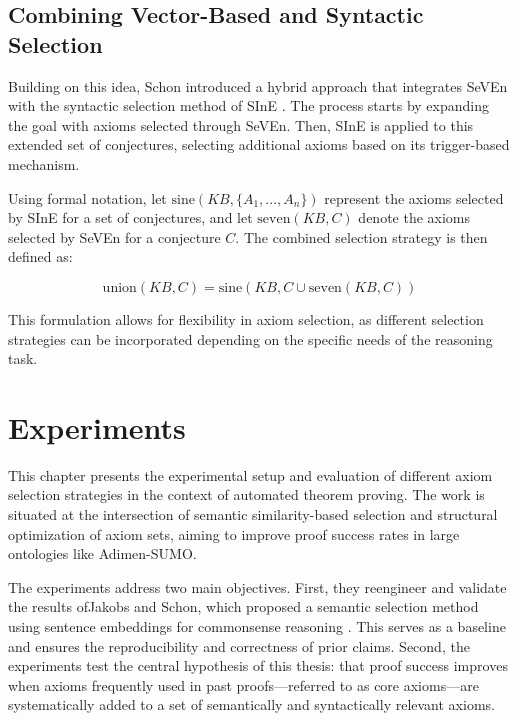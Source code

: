 \documentclass[english,version-2020-11]{uzl-thesis}
\begin{document}
\section{Combining Vector-Based and Syntactic Selection}

Building on this idea, Schon introduced a hybrid approach that integrates SeVEn with the syntactic selection method of SInE \cite{Schon2023}. The process starts by expanding the goal with axioms selected through SeVEn. Then, SInE is applied to this extended set of conjectures, selecting additional axioms based on its trigger-based mechanism. 

Using formal notation, let \( \text{sine}(KB, \{A_1, ..., A_n\}) \) represent the axioms selected by SInE for a set of conjectures, and let \( \text{seven}(KB, C) \) denote the axioms selected by SeVEn for a conjecture \( C \). The combined selection strategy is then defined as:

\begin{definition}
    \begin{equation}
        \text{union}(KB, C) = \text{sine}(KB, C \cup \text{seven}(KB, C))
    \end{equation}
\end{definition}

This formulation allows for flexibility in axiom selection, as different selection strategies can be incorporated depending on the specific needs of the reasoning task.


\chapter{Experiments}
\label{chapter-experiments}

This chapter presents the experimental setup and evaluation of different axiom selection strategies in the context of automated theorem proving. The work is situated at the intersection of semantic similarity-based selection and structural optimization of axiom sets, aiming to improve proof success rates in large ontologies like Adimen-SUMO.

The experiments address two main objectives. First, they reengineer and validate the results ofJakobs and Schon, which proposed a semantic selection method using sentence embeddings for commonsense reasoning \cite{Schon2024}. This serves as a baseline and ensures the reproducibility and correctness of prior claims. Second, the experiments test the central hypothesis of this thesis: that proof success improves when axioms frequently used in past proofs—referred to as core axioms—are systematically added to a set of semantically and syntactically relevant axioms.
\end{document}
